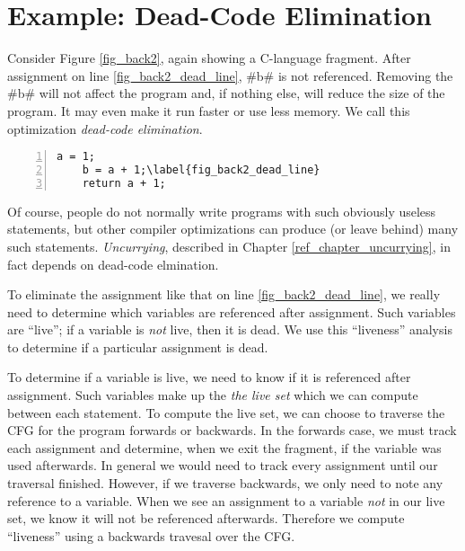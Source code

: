 \documentclass[12pt]{report}
\begin{document}
\section{Example: Dead-Code Elimination}

Consider Figure \ref{fig_back2}, again showing a C-language fragment.
After assignment on line \ref{fig_back2_dead_line}, #b# is not
referenced. Removing the #b# will not affect the program and,
if nothing else, will reduce the size of the program. It may even make
it run faster or use less memory. We call this optimization
\emph{dead-code elimination}.

\begin{myfig}[ht]
\begin{minipage}{1in}
  \begin{Verbatim}[numbers=left,commandchars=\\\{\}]
    a = 1;
    b = a + 1;\label{fig_back2_dead_line}
    return a + 1;
  \end{Verbatim}
\end{minipage}
\caption{A C-language fragment illustrating \emph{dead code}. After
assignment on line \ref{fig_back2_dead_line}, \verb=b= is not used
and can be considered ``dead.''}
\label{fig_back2}
\end{myfig}

Of course, people do not normally write programs with such obviously
useless statements, but other compiler optimizations can produce (or
leave behind) many such statements. \emph{Uncurrying}, described in
Chapter \ref{ref_chapter_uncurrying}, in fact depends on dead-code elmination.

To eliminate the assignment like that on line
\ref{fig_back2_dead_line}, we really need to determine which variables
are referenced after assignment. Such variables are ``live''; if a
variable is \emph{not} live, then it is dead. We use this ``liveness''
analysis to determine if a particular assignment is dead.

To determine if a variable is live, we need to know if it is
referenced after assignment.  Such variables make up the \emph{the
  live set} which we can compute between each statement. To compute
the live set, we can choose to traverse the CFG for the program forwards or
backwards.  In the forwards case, we must track each assignment and
determine, when we exit the fragment, if the variable was used
afterwards. In general we would need to track every assignment until
our traversal finished. However, if we traverse backwards, we only
need to note any reference to a variable. When we see an assignment to
a variable \emph{not} in our live set, we know it will not be
referenced afterwards. Therefore we compute ``liveness'' using a
backwards travesal over the CFG.
\end{document}
